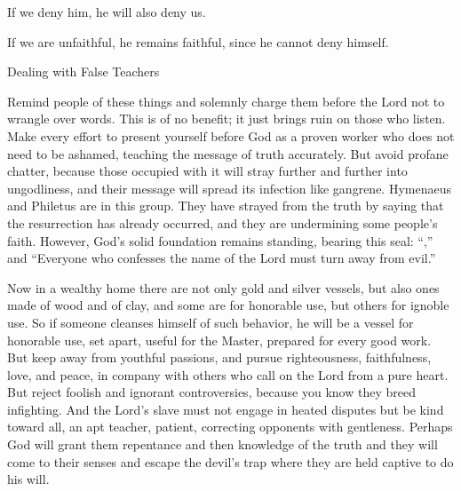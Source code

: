 {\par }{\Q If
we deny
him, he
will
also
deny
us.
\par }{\Q {}If
we are unfaithful,
he
remains
faithful,
since
he cannot
deny
himself.
\par }{\SH Dealing with False Teachers
\par }{\PP {}Remind
people of these things
and solemnly charge
them before
the Lord
not
to wrangle over words.
This is of
no
benefit;
it just brings ruin
on those who listen.
Make every effort
to present
yourself
before God
as a proven
worker
who does not need to be ashamed,
teaching
the message
of truth
accurately.
But
avoid
profane
chatter,
because
those occupied with it will stray
further and further
into ungodliness,
and
their
message
will
spread its infection
like
gangrene.
Hymenaeus
and
Philetus
are in this group.
They have strayed
from
the truth
by saying
that the resurrection
has
already
occurred,
and
they are undermining
some people’s
faith.
However,
God’s
solid
foundation
remains standing,
bearing
this
seal: “{},”
 and
“Everyone
who confesses
the name
of the Lord
must turn away
from
evil.”
\par }{\PP {}Now in
a wealthy
home
there are
not
only
gold
and
silver
vessels,
but
also
ones made of wood
and
of clay,
and
some are for
honorable use,
but
others for
ignoble use.
So
if
someone
cleanses
himself
of
such behavior,
he will be
a vessel
for
honorable use,
set apart,
useful
for the Master,
prepared
for
every
good
work.
But
keep away
from youthful
passions,
and
pursue
righteousness,
faithfulness,
love,
and peace,
in company with
others who call on
the Lord
from
a pure
heart.
But
reject
foolish
and
ignorant
controversies,
because
you know
they breed
infighting.
And
the Lord’s
slave
must
not
engage in heated disputes
but
be
kind
toward
all,
an apt teacher,
patient,
correcting
opponents
with
gentleness.
Perhaps
God
will grant
them
repentance
and then knowledge
of the truth
and
they will come to
their senses and escape
the devil’s
trap
where they
are held captive
to
do his
will.

}
